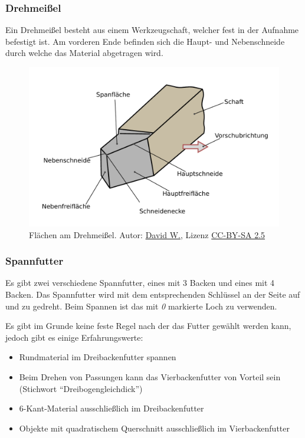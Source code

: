 \documentclass{\basedir/fablab-document}
\begin{document}
\newpage
\subsubsection{Drehmeißel}
Ein Drehmeißel besteht aus einem Werkzeugschaft, welcher fest in der Aufnahme befestigt ist. Am vorderen Ende befinden sich die Haupt- und Nebenschneide durch welche das Material
abgetragen wird.
\begin{figure}[ht]
\centering
\includegraphics[width = 0.75\linewidth]{img/drehmeissel}
\caption{Flächen am Drehmeißel. Autor: \href{http://commons.wikimedia.org/wiki/File:Flaechen_am_Schneidkeil.svg}{David W.}, Lizenz \href{http://creativecommons.org/licenses/by-sa/2.5}{CC-BY-SA 2.5}}
\end{figure}

\subsubsection{Spannfutter}

Es gibt zwei verschiedene Spannfutter, eines mit 3 Backen und eines mit 4 Backen. Das Spannfutter wird mit dem entsprechenden Schlüssel an der Seite auf und zu gedreht. Beim Spannen ist das mit \emph{0} markierte Loch zu verwenden.

Es gibt im Grunde keine feste Regel nach der das Futter gewählt werden kann, jedoch gibt es einige Erfahrungswerte:
\begin{itemize} 
\item Rundmaterial im Dreibackenfutter spannen
\item Beim Drehen von Passungen kann das Vierbackenfutter von Vorteil sein (Stichwort \enquote{Dreibogengleichdick})
\item 6-Kant-Material ausschließlich im Dreibackenfutter
\item Objekte mit quadratischem Querschnitt ausschließlich im Vierbackenfutter
\end{itemize}
\end{document}
